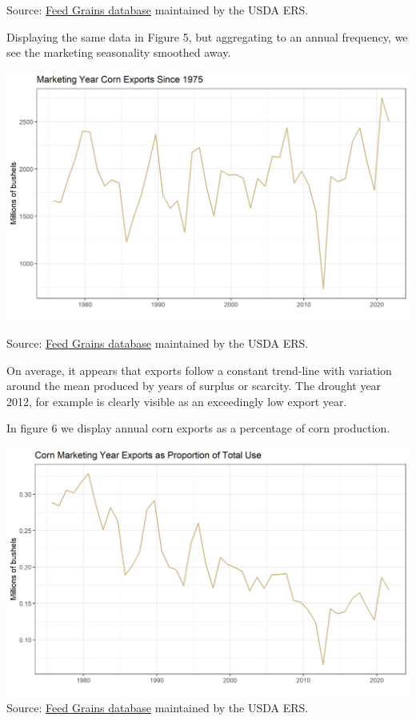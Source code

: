 \documentclass[
  letterpaper,
  DIV=11,
  numbers=noendperiod]{scrreprt}
\begin{document}
Source:
\href{http://www.ers.usda.gov/data-products/feed-grains-database/feed-grains-yearbook-tables.aspx\#26780}{Feed
Grains database} maintained by the USDA ERS.

Displaying the same data in Figure 5, but aggregating to an annual
frequency, we see the marketing seasonality smoothed away.

\includegraphics{assets/ForecastingUseof-ExportsMY.png}

Source:
\href{http://www.ers.usda.gov/data-products/feed-grains-database/feed-grains-yearbook-tables.aspx\#26780}{Feed
Grains database} maintained by the USDA ERS.

On average, it appears that exports follow a constant trend-line with
variation around the mean produced by years of surplus or scarcity. The
drought year 2012, for example is clearly visible as an exceedingly low
export year.

In figure 6 we display annual corn exports as a percentage of corn
production.

\includegraphics{assets/ForecastingUseof-CornUseCategoriesExportsPropofUse.png}
Source:
\href{http://www.ers.usda.gov/data-products/feed-grains-database/feed-grains-yearbook-tables.aspx\#26780}{Feed
Grains database} maintained by the USDA ERS.
\end{document}
